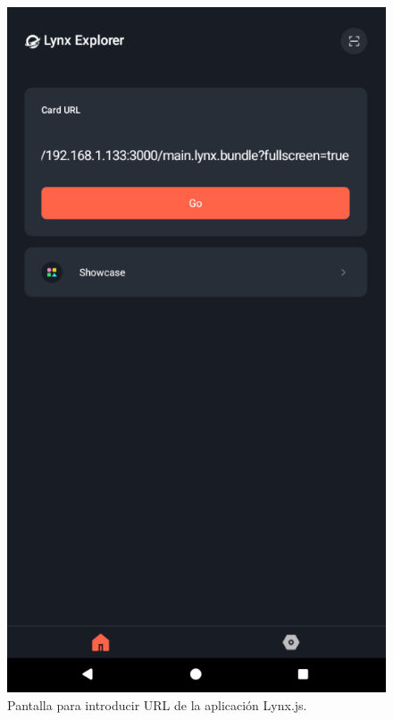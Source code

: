 \begin{figure}[h]
  \centering
  \begin{minipage}[t]{0.3\textwidth}
    \centering
    \includegraphics[width=\textwidth]{assets/lynx-application-url.png}
    \caption{Pantalla para introducir URL de la aplicación Lynx.js.}
    \label{fig:lynx-application-url}
  \end{minipage}
  \hfill
  \begin{minipage}[t]{0.3\textwidth}

\end{minipage}
\end{figure}
